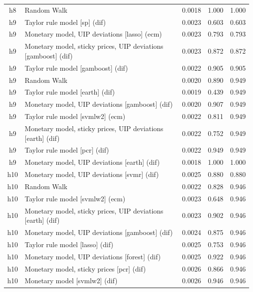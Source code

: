 \begin{ThreePartTable}
\begin{longtable}[t]{cp{5.5cm}ccc}
h8 & \raggedright Random Walk & 0.0018 & 1.000 & 1.000\\
\addlinespace
h9 & \raggedright Taylor rule model [sp] (dif) & 0.0023 & 0.603 & 0.603\\
h9 & \raggedright Monetary model, UIP deviations [lasso] (ecm) & 0.0023 & 0.793 & 0.793\\
h9 & \raggedright Monetary model, sticky prices, UIP deviations [gamboost] (dif) & 0.0023 & 0.872 & 0.872\\
h9 & \raggedright Taylor rule model [gamboost] (dif) & 0.0022 & 0.905 & 0.905\\
h9 & \raggedright Random Walk & 0.0020 & 0.890 & 0.949\\
h9 & \raggedright Taylor rule model [earth] (dif) & 0.0019 & 0.439 & 0.949\\
h9 & \raggedright Monetary model, UIP deviations [gamboost] (dif) & 0.0020 & 0.907 & 0.949\\
h9 & \raggedright Taylor rule model [svmlw2] (ecm) & 0.0022 & 0.811 & 0.949\\
h9 & \raggedright Monetary model, sticky prices, UIP deviations [earth] (dif) & 0.0022 & 0.752 & 0.949\\
h9 & \raggedright Taylor rule model [pcr] (dif) & 0.0022 & 0.949 & 0.949\\
h9 & \raggedright Monetary model, UIP deviations [earth] (dif) & 0.0018 & 1.000 & 1.000\\
\addlinespace
h10 & \raggedright Monetary model, UIP deviations [svmr] (dif) & 0.0025 & 0.880 & 0.880\\
h10 & \raggedright Random Walk & 0.0022 & 0.828 & 0.946\\
h10 & \raggedright Taylor rule model [svmlw2] (ecm) & 0.0023 & 0.648 & 0.946\\
h10 & \raggedright Monetary model, sticky prices, UIP deviations [earth] (dif) & 0.0023 & 0.902 & 0.946\\
h10 & \raggedright Monetary model, UIP deviations [gamboost] (dif) & 0.0024 & 0.875 & 0.946\\
h10 & \raggedright Taylor rule model [lasso] (dif) & 0.0025 & 0.753 & 0.946\\
h10 & \raggedright Monetary model, UIP deviations [forest] (dif) & 0.0025 & 0.922 & 0.946\\
h10 & \raggedright Monetary model, sticky prices [pcr] (dif) & 0.0026 & 0.866 & 0.946\\
h10 & \raggedright Monetary model [svmlw2] (dif) & 0.0026 & 0.946 & 0.946\\

\end{longtable}
\end{ThreePartTable}
